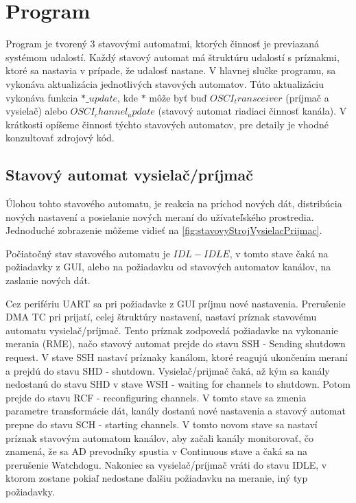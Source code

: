 \documentclass[main.tex]{subfiles}
\begin{document}
	\section{Program}
		\begin{multicols*}{2}
			\noindent Program je tvorený 3 stavovými automatmi, ktorých činnosť je previazaná systémom udalostí. Každý stavový automat má štruktúru udalostí s  príznakmi, ktoré sa nastavia v prípade, že udalosť nastane. V hlavnej slučke programu, sa vykonáva aktualizácia jednotlivých stavových automatov. Túto aktualizáciu vykonáva funkcia $*\_update$, kde $*$ môže byť buď $OSCI_transceiver$ (príjmač a vysielač) alebo $OSCI_channel_update$ (stavový automat riadiaci činnosť kanála). V krátkosti opíšeme činnosť týchto stavových automatov, pre detaily je vhodné konzultovať zdrojový kód. %
			
			\subsection{Stavový automat vysielač/príjmač}
			Úlohou tohto stavového automatu, je reakcia na príchod nových dát, distribúcia nových nastavení a posielanie nových meraní do užívateľského prostredia. Jednoduché zobrazenie môžeme vidieť na \cref{fig:stavovyStrojVysielacPrijmac}.
			
			
			Počiatočný stav stavového automatu je $IDL-IDLE$, v tomto stave čaká na požiadavky z GUI, alebo na požiadavku od stavových automatov kanálov, na zaslanie nových dát.
			
			Cez perifériu UART sa pri požiadavke z GUI príjmu nové nastavenia. Prerušenie DMA TC pri prijatí, celej štruktúry nastavení, nastaví príznak stavovému automatu vysielač/príjmač. Tento príznak zodpovedá požiadavke na vykonanie merania (RME), načo stavový automat prejde do stavu SSH - Sending shutdown request. V stave SSH nastaví príznaky kanálom, ktoré reagujú ukončením meraní a prejdú do stavu SHD - shutdown. Vysielač/prijmač čaká, až kým sa kanály nedostanú do stavu SHD v stave WSH - waiting for channels to shutdown. Potom prejde do stavu RCF - reconfiguring channels. V tomto stave sa zmenia parametre transformácie dát, kanály dostanú nové nastavenia a stavový automat prepne do stavu SCH - starting channels. V tomto novom stave sa nastaví príznak stavovým automatom kanálov, aby začali kanály monitorovať, čo znamená, že sa AD prevodníky spustia v Continuous stave a čaká sa na prerušenie Watchdogu. Nakoniec sa vysielač/príjmač vráti do stavu IDLE, v ktorom zostane pokiaľ nedostane ďalšiu požiadavku na meranie, iný typ požiadavky.
			

\end{multicols*}
\end{document}
